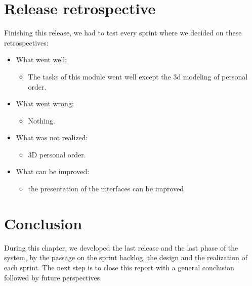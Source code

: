 \documentclass[12pt,a4paper]{report}
\begin{document}
	\section{Release retrospective}
		Finishing this release, we had to test every sprint where we decided on these retrospectives:\\
	\begin{itemize}
		\item	What went well:
		\begin{itemize}
			\item The tasks of this module went well except the \ac{3d} modeling of personal order.
		\end{itemize}
	\end{itemize}
	\begin{itemize}
		\item	What went wrong:
		\begin{itemize}
			\item Nothing.
		\end{itemize}
	\end{itemize}
	\begin{itemize}
		\item	What was not realized:
		\begin{itemize}
			\item 3D personal order.
		\end{itemize}
	\end{itemize}
	\begin{itemize}
		\item	What can be improved:
		\begin{itemize}
			\item the presentation of the interfaces can be improved
		\end{itemize}
	\end{itemize}
	\section*{Conclusion}
	During this chapter, we developed the last release and the last phase of the system, by the passage on the sprint backlog, the design and the realization of each sprint. The next step is to close this report with a general conclusion followed by future perspectives.
\end{document}
